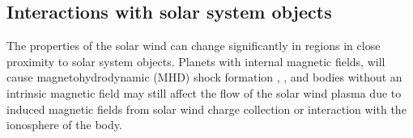
\subsection*{Interactions with solar system objects}
The properties of the solar wind can change significantly in regions in close proximity to solar system objects. Planets with internal magnetic fields, will cause magnetohydrodynamic (MHD) shock formation \parencite{Luhmann2004}, \parencite{Benna2009}, and bodies without an intrinsic magnetic field may still affect the flow of the solar wind plasma due to induced magnetic fields from solar wind charge collection or interaction with the ionosphere of the body.

